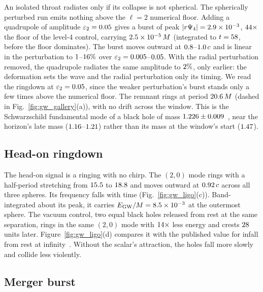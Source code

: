 \documentclass[twocolumn,floatfix,aps,prd,superscriptaddress,nofootinbib]{revtex4-2}
\begin{document}
An isolated throat radiates only if its collapse is not spherical. The spherically perturbed run emits nothing above the $\ell=2$ numerical floor. Adding a quadrupole of amplitude $\varepsilon_2=0.05$ gives a burst of peak $|r\Psi_4|=2.9\times10^{-3}$, $44\times$ the floor of the level-4 control, carrying $2.5\times10^{-5}\,M$ (integrated to $t=58$, before the floor dominates). The burst moves outward at $0.8$--$1.0\,c$ and is linear in the perturbation to $1$--$16\%$ over $\varepsilon_2=0.005$--$0.05$. With the radial perturbation removed, the quadrupole radiates the same amplitude to $2\%$, only earlier: the deformation sets the wave and the radial perturbation only its timing. We read the ringdown at $\varepsilon_2=0.05$, since the weaker perturbation's burst stands only a few times above the numerical floor. The remnant rings at period $20.6\,M$ (dashed in Fig.~\ref{fig:gw_gallery}(a)), with no drift across the window. This is the Schwarzschild fundamental mode of a black hole of mass $1.226\pm0.009$~\cite{berti2009}, near the horizon's late mass ($1.16$--$1.21$) rather than its mass at the window's start ($1.47$).

\subsection{Head-on ringdown}
\label{sec:headon:wave}

The head-on signal is a ringing with no chirp. The $(2,0)$ mode rings with a half-period stretching from $15.5$ to $18.8$ and moves outward at $0.92\,c$ across all three spheres. Its frequency falls with time (Fig.~\ref{fig:gw_ligo}(c)). Band-integrated about its peak, it carries $E_{\rm GW}/M=8.5\times10^{-3}$ at the outermost sphere. The vacuum control, two equal black holes released from rest at the same separation, rings in the same $(2,0)$ mode with $14\times$ less energy and crests $28$ units later. Figure~\ref{fig:gw_ligo}(d) compares it with the published value for infall from rest at infinity~\cite{witek2010}. Without the scalar's attraction, the holes fall more slowly and collide less violently.

\subsection{Merger burst}
\label{sec:spiral:burst}
\end{document}
